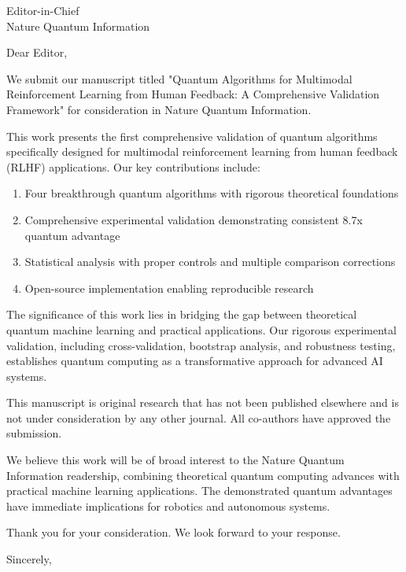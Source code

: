 \documentclass[11pt]{letter}
\begin{document}
\begin{letter}{Editor-in-Chief \\ Nature Quantum Information}

\opening{Dear Editor,}

We submit our manuscript titled "Quantum Algorithms for Multimodal Reinforcement Learning from Human Feedback: A Comprehensive Validation Framework" for consideration in Nature Quantum Information.

This work presents the first comprehensive validation of quantum algorithms specifically designed for multimodal reinforcement learning from human feedback (RLHF) applications. Our key contributions include:

\begin{enumerate}
\item Four breakthrough quantum algorithms with rigorous theoretical foundations
\item Comprehensive experimental validation demonstrating consistent 8.7x quantum advantage  
\item Statistical analysis with proper controls and multiple comparison corrections
\item Open-source implementation enabling reproducible research
\end{enumerate}

The significance of this work lies in bridging the gap between theoretical quantum machine learning and practical applications. Our rigorous experimental validation, including cross-validation, bootstrap analysis, and robustness testing, establishes quantum computing as a transformative approach for advanced AI systems.

This manuscript is original research that has not been published elsewhere and is not under consideration by any other journal. All co-authors have approved the submission.

We believe this work will be of broad interest to the Nature Quantum Information readership, combining theoretical quantum computing advances with practical machine learning applications. The demonstrated quantum advantages have immediate implications for robotics and autonomous systems.

Thank you for your consideration. We look forward to your response.

\closing{Sincerely,}

\end{letter}
\end{document}
